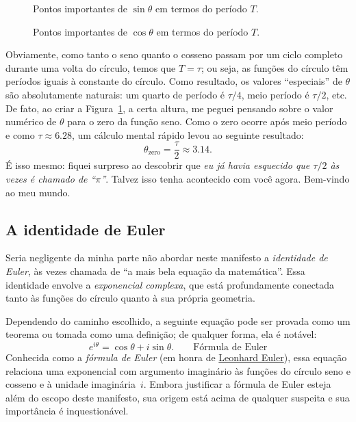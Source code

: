 {\begin{figure}
\begin{center}
\end{center}
\caption{Pontos importantes de $\sin\theta$ em termos do período $T$.\label{fig:sine_with_tau}}
\end{figure}

\begin{figure}
\begin{center}
\end{center}
\caption{Pontos importantes de $\cos\theta$ em termos do período $T$.\label{fig:cosine_with_tau}}
\end{figure}

Obviamente, como tanto o seno quanto o cosseno passam por um ciclo completo durante uma volta do círculo, temos que $T = \tau$; ou seja, as funções do círculo têm períodos iguais à constante do círculo. Como resultado, os valores ``especiais'' de $\theta$ são absolutamente naturais: um quarto de período é $\tau/4$, meio período é $\tau/2$, etc. De fato, ao criar a Figura~\ref{fig:sine_with_tau}, a certa altura, me peguei pensando sobre o valor numérico de $\theta$ para o zero da função seno. Como o zero ocorre após meio período e como $\tau \approx 6.28$, um cálculo mental rápido levou ao seguinte resultado:
\[
  \theta_\mathrm{zero} = \frac{\tau}{2} \approx 3.14.
\]
É isso mesmo: fiquei surpreso ao descobrir que \emph{eu já havia esquecido que $\tau/2$ às vezes é chamado de ``$\pi$''}. Talvez isso tenha acontecido com você agora. Bem-vindo ao meu mundo.



   \subsection{A identidade de Euler} %
   \label{sec:euler_s_identity}

Seria negligente da minha parte não abordar neste manifesto a \emph{identidade de Euler}, às vezes chamada de ``a mais bela equação da matemática''. Essa identidade envolve a \emph{exponencial complexa}, que está profundamente conectada tanto às funções do círculo quanto à sua própria geometria.

Dependendo do caminho escolhido, a seguinte equação pode ser provada como um teorema ou tomada como uma definição; de qualquer forma, ela é notável:
\begin{equation}
\label{eq:eulers_formula}
e^{i\theta} = \cos\theta + i\sin\theta. \qquad\mbox{Fórmula de Euler}
\end{equation}
Conhecida como a \emph{fórmula de Euler} (em honra de \href{https://pt.wikipedia.org/wiki/Leonhard_Euler}{Leonhard Euler}), essa equação relaciona uma exponencial com argumento imaginário às funções do círculo seno e cosseno e à unidade imaginária~$i$. Embora justificar a fórmula de Euler esteja além do escopo deste manifesto, sua origem está acima de qualquer suspeita e sua importância é inquestionável.

}
